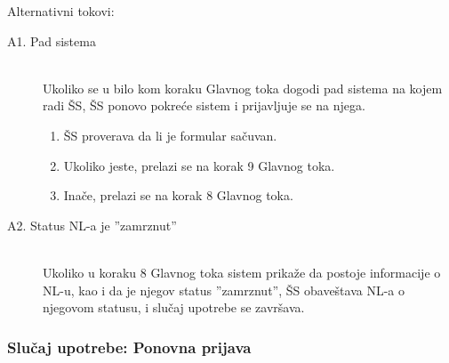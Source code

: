 \noindent Alternativni tokovi: 
\begin{description}
	\item[A1. Pad sistema] ~\\
	Ukoliko se u bilo kom koraku Glavnog toka dogodi pad sistema na kojem radi \v SS, \v SS ponovo pokre\'ce sistem i prijavljuje se na njega.
	\begin{enumerate}
		\item \v SS proverava da li je formular sa\v cuvan.
		\item Ukoliko jeste, prelazi se na korak 9 Glavnog toka.
		\item Ina\v ce, prelazi se na korak 8 Glavnog toka.
	\end{enumerate}

	\item[A2. Status NL-a je ''zamrznut''] ~\\
	Ukoliko u koraku 8 Glavnog toka sistem prika\v ze da postoje informacije o NL-u, kao i da je njegov status ''zamrznut'', \v SS obave\v stava NL-a o njegovom statusu, i slu\v caj upotrebe se zavr\v sava.
\end{description}

\subsubsection{Slu\v caj upotrebe: Ponovna prijava}
\label{su: ponovna prijava}

